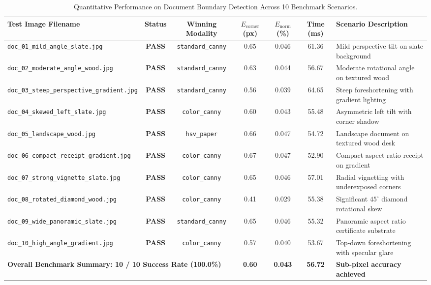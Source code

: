 \documentclass[11pt,a4paper]{article}
\begin{document}
\begin{table}[ht]
\centering
\small
\caption{Quantitative Performance on Document Boundary Detection Across 10 Benchmark Scenarios.}
\label{tab:benchmark_results}
\begin{tabularx}{\textwidth}{lcccccX}
\toprule
\textbf{Test Image Filename} & \textbf{Status} & \textbf{Winning Modality} & \textbf{$E_{\text{corner}}$ (px)} & \textbf{$E_{\text{norm}}$ (\%)} & \textbf{Time (ms)} & \textbf{Scenario Description} \\
\midrule
\texttt{doc\_01\_mild\_angle\_slate.jpg}        & \textcolor{primaryblue}{\textbf{PASS}} & \texttt{standard\_canny} & 0.65 & 0.046 & 61.36 & Mild perspective tilt on slate background \\
\texttt{doc\_02\_moderate\_angle\_wood.jpg}     & \textcolor{primaryblue}{\textbf{PASS}} & \texttt{standard\_canny} & 0.63 & 0.044 & 56.67 & Moderate rotational angle on textured wood \\
\texttt{doc\_03\_steep\_perspective\_gradient.jpg}& \textcolor{primaryblue}{\textbf{PASS}} & \texttt{standard\_canny} & 0.56 & 0.039 & 64.65 & Steep foreshortening with gradient lighting \\
\texttt{doc\_04\_skewed\_left\_slate.jpg}       & \textcolor{primaryblue}{\textbf{PASS}} & \texttt{color\_canny}    & 0.60 & 0.043 & 55.48 & Asymmetric left tilt with corner shadow \\
\texttt{doc\_05\_landscape\_wood.jpg}          & \textcolor{primaryblue}{\textbf{PASS}} & \texttt{hsv\_paper}      & 0.66 & 0.047 & 54.72 & Landscape document on textured wood desk \\
\texttt{doc\_06\_compact\_receipt\_gradient.jpg}& \textcolor{primaryblue}{\textbf{PASS}} & \texttt{color\_canny}    & 0.67 & 0.047 & 52.90 & Compact aspect ratio receipt on gradient \\
\texttt{doc\_07\_strong\_vignette\_slate.jpg}   & \textcolor{primaryblue}{\textbf{PASS}} & \texttt{color\_canny}    & 0.65 & 0.046 & 57.01 & Radial vignetting with underexposed corners \\
\texttt{doc\_08\_rotated\_diamond\_wood.jpg}    & \textcolor{primaryblue}{\textbf{PASS}} & \texttt{color\_canny}    & 0.41 & 0.029 & 55.38 & Significant $45^\circ$ diamond rotational skew \\
\texttt{doc\_09\_wide\_panoramic\_slate.jpg}    & \textcolor{primaryblue}{\textbf{PASS}} & \texttt{standard\_canny} & 0.65 & 0.046 & 55.32 & Panoramic aspect ratio certificate substrate \\
\texttt{doc\_10\_high\_angle\_gradient.jpg}     & \textcolor{primaryblue}{\textbf{PASS}} & \texttt{color\_canny}    & 0.57 & 0.040 & 53.67 & Top-down foreshortening with specular glare \\
\midrule
\multicolumn{3}{l}{\textbf{Overall Benchmark Summary: 10 / 10 Success Rate (100.0\%)}} & \textbf{0.60} & \textbf{0.043} & \textbf{56.72} & \textbf{Sub-pixel accuracy achieved} \\
\bottomrule
\end{tabularx}
\end{table}
\end{document}
